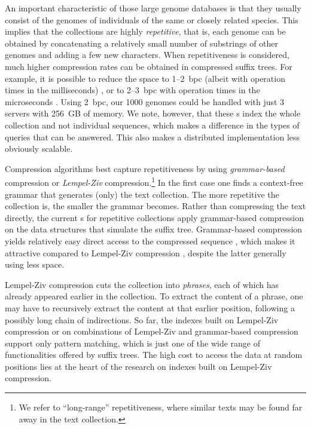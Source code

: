 An important characteristic of those large genome databases is that they
usually consist of the genomes of individuals of the same or closely related
species. This implies that the collections are highly \emph{repetitive}, that
is, each genome can be obtained by concatenating a relatively small number of
substrings of other genomes
and adding a few new characters. When repetitiveness is considered, much higher
compression rates can be obtained in compressed suffix trees. For example, it is possible to reduce
the space to 1--2~bpc (albeit with operation times in the milliseconds)
\cite{Abeliuk2013}, or to 2--3~bpc with operation times in the microseconds
\cite{Navarro2015}. Using 2~bpc, our 1000 genomes could be handled
with just 3 servers with 256~GB of memory. We note, however, that these \CST{}s index
the whole collection and not individual sequences, which makes a difference in
the types of queries that can be answered. This also makes a distributed
implementation less obviously scalable.

Compression algorithms best capture repetitiveness by using \emph{grammar-based}
compression or \emph{Lempel-Ziv} compression.\footnote{We refer to ``long-range''
repetitiveness, where similar texts may be found far away in the text
collection.} In the first case \cite{KY00,CLLPPSS05} one finds a context-free
grammar that generates (only) the text collection. The more repetitive the
collection is, the smaller the grammar becomes. Rather than compressing the text directly,
the current \CST{}s for repetitive collections \cite{Abeliuk2013,Navarro2015}
apply grammar-based compression on the data structures that simulate the suffix tree.
Grammar-based compression yields relatively easy direct access to the compressed
sequence \cite{BLRSRW15}, which makes it attractive compared to Lempel-Ziv
compression \cite{ZL77}, despite the latter generally using less space.

Lempel-Ziv compression cuts the collection into \emph{phrases}, each of which
has already appeared earlier in the collection. To extract the content of a phrase, one may have
to recursively extract the content at that earlier position, following a 
possibly long chain of indirections.
So far, the indexes built on Lempel-Ziv compression \cite{KN13} or on
combinations of Lempel-Ziv and grammar-based compression \cite{GGKNP12,GGKNP14,GP15}
support only pattern matching, which is just one of the wide range of
functionalities offered by suffix trees. The high cost to access the data
at random positions lies at the heart of the research on indexes built on
Lempel-Ziv compression.

